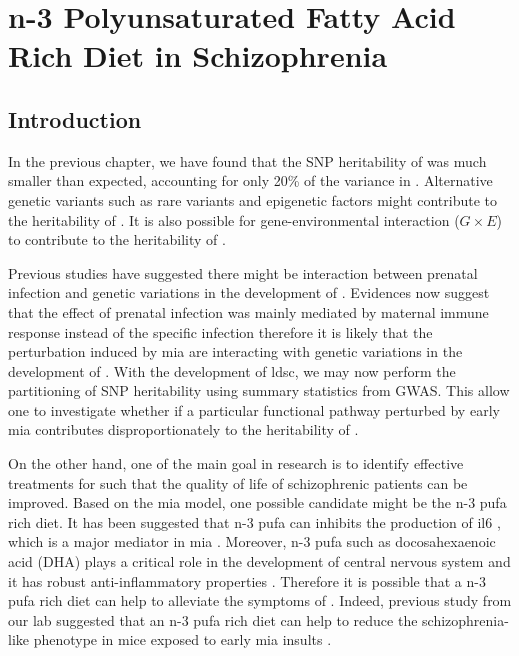 \chapter{n-3 Polyunsaturated Fatty Acid Rich Diet in Schizophrenia}
\label{omegaProject}
\section{Introduction}
In the previous chapter, we have found that the \gls{SNP} heritability of  was much smaller than expected, accounting for only 20\% of the variance in .
Alternative genetic variants such as rare variants and epigenetic factors might contribute to the heritability of .
It is also possible for gene-environmental interaction ($G\times E$) to contribute to the heritability of .

Previous studies have suggested there might be interaction between prenatal infection and genetic variations in the development of  \citep{Tienari2004,Clarke2009}.
Evidences now suggest that the effect of prenatal infection was mainly mediated by maternal immune response instead of the specific infection \citep{Brown2010} therefore it is likely that the perturbation induced by \gls{mia} are interacting with genetic variations in the development of .
With the development of \gls{ldsc}, we may now perform the partitioning of \gls{SNP} heritability using summary statistics from \gls{GWAS}. 
This allow one to investigate whether if a particular functional pathway perturbed by early \gls{mia} contributes disproportionately to the heritability of .

On the other hand, one of the main goal in  research is to identify effective treatments for  such that the quality of life of schizophrenic patients can be improved. 
Based on the \gls{mia} model, one possible candidate might be the n-3 \gls{pufa} rich diet. 
It has been suggested that n-3 \gls{pufa} can inhibits the production of \gls{il6} \citep{Trebble2003}, which is a major mediator in \gls{mia} \citep{Smith2007}.
Moreover, n-3 \gls{pufa} such as docosahexaenoic acid (DHA) plays a critical role in the development of central nervous system \citep{Clandinin1999,Kitajka2002} and it has robust anti-inflammatory properties \citep{Trebble2003}.
Therefore it is possible that a n-3 \gls{pufa} rich diet can help to alleviate the symptoms of .
Indeed, previous study from our lab suggested that an n-3 \gls{pufa} rich diet can help to reduce the schizophrenia-like phenotype in mice exposed to early \gls{mia} insults \citep{Li2015}.

